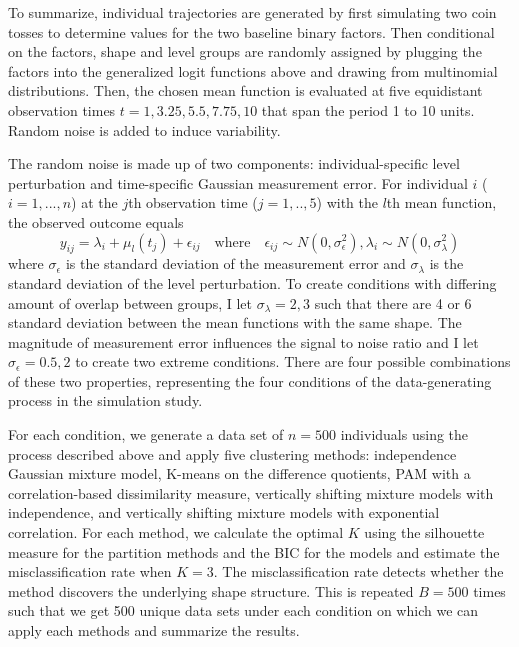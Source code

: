 \documentclass[12pt]{article}
\begin{document}
To summarize, individual trajectories are generated by first simulating two coin tosses to determine values for the two baseline binary factors. Then conditional on the factors, shape and level groups are randomly assigned by plugging the factors into the generalized logit functions above and drawing from multinomial distributions. Then, the chosen mean function is evaluated at five equidistant observation times $t=1,3.25,5.5,7.75,10$ that span the period 1 to 10 units. Random noise is added to induce variability. 

The random noise is made up of two components: individual-specific level perturbation and time-specific Gaussian measurement error. For individual $i$ ($i=1,...,n$) at the $j$th observation time ($j=1,..,5$) with the $l$th mean function, the observed outcome equals
$$y_{ij} = \lambda_{i}+\mu_{l}(t_{j})+\epsilon_{ij}\quad\text{where}\quad \epsilon_{ij}\sim N(0,\sigma_{\epsilon}^{2}), \lambda_{i}\sim N(0,\sigma_{\lambda}^{2})$$
where $\sigma_{\epsilon}$  is the standard deviation of the measurement error and $\sigma_{\lambda}$ is the standard deviation of the level perturbation. To create conditions with differing amount of overlap between groups, I let $\sigma_{\lambda}=2,3$ such that there are 4 or 6 standard deviation between the mean functions with the same shape. The magnitude of measurement error influences the signal to noise ratio and I let $\sigma_{\epsilon}=0.5, 2$ to create two extreme conditions. There are four possible combinations of these two properties, representing the four  conditions of the data-generating process in the simulation study. 

For each condition, we generate a data set of $n=500$ individuals using the process described above and apply five clustering methods: independence Gaussian mixture model, K-means on the difference quotients, PAM with a correlation-based dissimilarity measure, vertically shifting mixture models with independence, and vertically shifting mixture models with exponential correlation. For each method, we calculate the optimal $K$ using the silhouette measure \cite{kaufman1990}  for the partition methods and the BIC \cite{schwarz1978} for the models and estimate the misclassification rate when $K=3$. The misclassification rate detects whether the method discovers the underlying shape structure. This is repeated $B=500$ times such that we get 500 unique data sets under each condition on which we can apply each methods and summarize the results. 
\end{document}
